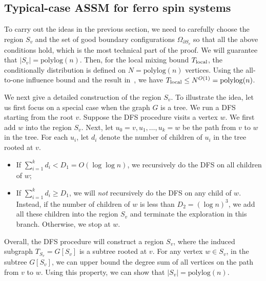 \documentclass[11pt]{amsart}
\theoremstyle{definition}
\theoremstyle{remark}
\begin{document}
\subsection{Typical-case ASSM for ferro spin systems}\label{sec:T-ASSM-overview}
To carry out the ideas in the previous section, %
we need to carefully choose the region $S_v$ and the set of good boundary configurations $\Omega_{\partial S_v}$ so that all the above conditions hold, which is the most technical part of the proof. 
We will guarantee that $|S_v| = \mathrm{polylog}(n)$.
Then, for the local mixing bound $T_{\textnormal{local}}$, the conditionally distribution is defined on $N = \mathrm{polylog}(n)$ vertices. Using the all-to-one influence bound and the result in~\cite{ALO24}, we have $T_{\textnormal{local}} \leq N^{O(1)} = \mathrm{polylog}(n)$.

We next give a detailed construction of the region $S_v$. To illustrate the idea, let us first focus on a special case when the graph $G$ is a tree. We run a DFS starting from the root $v$. Suppose the DFS procedure visits a vertex $w$. We first add $w$ into the region $S_v$. Next, let $u_0 = v, u_1, \ldots, u_k = w$ be the path from $v$ to $w$ in the tree. For each $u_i$, let $d_i$ denote the number of children of $u_i$ in the tree rooted at $v$. 
\begin{itemize}
    \item If $\sum_{i=1}^k d_i < D_1 = O(\log \log n)$, we recursively do the DFS on all children of $w$;
    \item If $\sum_{i=1}^k d_i \geq D_1$, we will \emph{not} recursively do the DFS on any child of $w$. 
      Instead, if the number of children of $w$ is less than $D_2 = (\log n)^3$, we add all these children into the region $S_v$ and terminate the exploration in this branch.
      Otherwise, we stop at $w$.%
\end{itemize}
Overall, the DFS procedure will construct a region $S_v$, where the induced subgraph $T_{S_v} = G[S_v]$ is a subtree rooted at $v$. For any vertex $w \in S_v$, in the subtree $G[S_v]$, we can upper bound the degree sum of all vertices on the path from $v$ to $w$. Using this property, we can show that $|S_v| = \mathrm{polylog}(n)$.  
\end{document}
